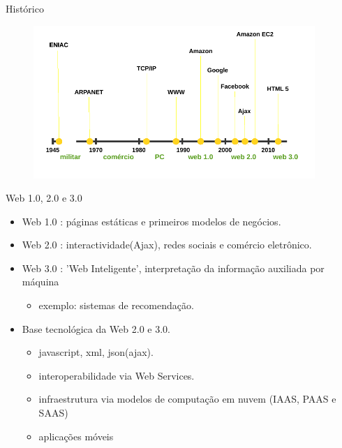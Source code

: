 \begin{frame}[fragile,t]{Histórico}
  \begin{figure}[h!]
    \centering
    \includegraphics[width=0.95\textwidth]{imagens/historico.png}
  \end{figure} 
\end{frame}
\begin{frame}[fragile,t]{Web 1.0, 2.0 e 3.0}
  \begin{itemize}
    \item \alert{Web 1.0} : páginas estáticas e primeiros modelos de negócios.
    \item \alert{Web 2.0} : interactividade(Ajax), redes sociais e comércio eletrônico.
    \item \alert{Web 3.0} : 'Web Inteligente', interpretação da informação auxiliada por máquina 
    \begin{itemize}
      \item exemplo: sistemas de recomendação.
    \end{itemize}
    \item Base tecnológica da Web 2.0 e 3.0.
    \begin{itemize}
      \item javascript, xml, json(ajax).
      \item interoperabilidade via Web Services.
      \item infraestrutura via modelos de \alert{computação em nuvem} (IAAS, PAAS e SAAS)
      \item aplicações móveis
    \end{itemize}
  \end{itemize}
\end{frame}
